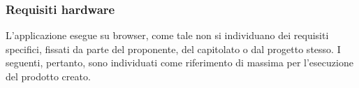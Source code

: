 \subsubsection{Requisiti hardware}
L’applicazione esegue su browser, come tale non si individuano dei requisiti specifici, fissati da parte
del proponente, del capitolato o dal progetto stesso. I seguenti, pertanto, sono individuati come
riferimento di massima per l’esecuzione del prodotto creato. 

